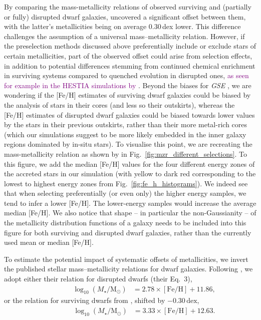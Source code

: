 \documentclass[fleqn,usenatbib]{mnras}
\newcommand{\changed}[1]{{\textcolor{purple}{#1}}}
\begin{document}
By comparing the mass-metallicity relations of observed surviving and (partially or fully) disrupted dwarf galaxies, \citet{Naidu2022b} uncovered a significant offset between them, with the latter's metallicities being on average 0.30\,dex lower. This difference challenges the assumption of a universal mass–metallicity relation. However, if the preselection methods discussed above preferentially include or exclude stars of certain metallicities, part of the observed offset could arise from selection effects, in addition to potential differences stemming from continued chemical enrichment in surviving systems compared to quenched evolution in disrupted ones, \changed{as seen for example in the HESTIA simulations by \citet{Khoperskov2023c}}. Beyond the biases for \textit{GSE} \citep{Skuladottir2025}, we are wondering if the [Fe/H] estimates of surviving dwarf galaxies could be biased by the analysis of stars in their cores (and less so their outskirts), whereas the [Fe/H] estimates of disrupted dwarf galaxies could be biased towards lower values by the stars in their previous outskirts, rather than their more metal-rich cores (which our simulations suggest to be more likely embedded in the inner galaxy regions dominated by in-situ stars). To visualise this point, we are recreating the mass-metallicity relation as shown by \citet{Naidu2022b} in Fig.~\ref{fig:mzr_different_selections}. To this figure, we add the median [Fe/H] values for the four different energy zones of the accreted stars in our simulation (with yellow to dark red corresponding to the lowest to highest energy zones from Fig.~\ref{fig:fe_h_histograms}). We indeed see that when selecting preferentially (or even only) the higher energy samples, we tend to infer a lower [Fe/H]. The lower-energy samples would increase the average median [Fe/H]. We also notice that shape -- in particular the non-Gaussianity -- of the metallicity distribution functions of a galaxy needs to be included into this figure for both surviving and disrupted dwarf galaxies, rather than the currently used mean or median [Fe/H].

To estimate the potential impact of systematic offsets of metallicities, we invert the published stellar mass–metallicity relations for dwarf galaxies. Following \citet{Naidu2022b}, we adopt either their relation for disrupted dwarfs (their Eq.~3),
\begin{align}
\qquad\qquad    \log_{10} (M_\star/\mathrm{M_\odot}) &= 2.78 \times \mathrm{[Fe/H]} + 11.86 , \label{eq:naidu}
\end{align}
or the relation for surviving dwarfs from \citet{Kirby2013}, shifted by $-0.30\,\mathrm{dex}$,
\begin{align}
\qquad\qquad    \log_{10} (M_\star/\mathrm{M_\odot}) &= 3.33 \times \mathrm{[Fe/H]} + 12.63 . \label{eq:kirby}
\end{align}
\end{document}
